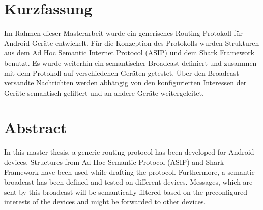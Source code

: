 \setcounter{page}{1}
\onehalfspacing
{}
\section{Kurzfassung}
Im Rahmen dieser Masterarbeit wurde ein generisches Routing-Protokoll für Android-Geräte entwickelt. Für die Konzeption des Protokolls wurden Strukturen aus dem Ad Hoc Semantic Internet Protocol (ASIP) und dem Shark Framework benutzt. Es wurde weiterhin ein semantischer Broadcast definiert und zusammen mit dem Protokoll auf verschiedenen Geräten getestet. Über den Broadcast versandte Nachrichten werden abhängig von den konfigurierten Interessen der Geräte semantisch gefiltert und an andere Geräte weitergeleitet.
\vspace{-1em}
\section*{Abstract}
In this master thesis, a generic routing protocol has been developed for Android devices. Structures from Ad Hoc Semantic Protocol (ASIP) and Shark Framework have been used while drafting the protocol. Furthermore, a semantic broadcast has been defined and tested on different devices. Messages, which are sent by this broadcast will be semantically filtered based on the preconfigured interests of the devices and might be forwarded to other devices.


